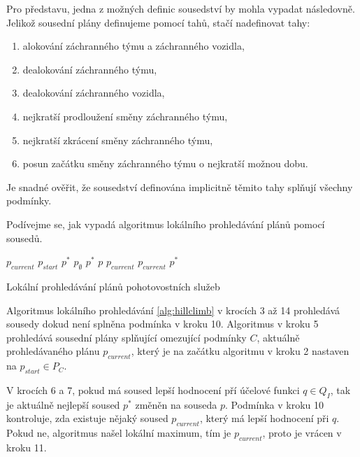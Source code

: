 \begin{exmp}\label{pr:sousedi}
Pro představu, jedna z možných definic sousedství by mohla vypadat následovně.
Jelikož sousední plány definujeme pomocí tahů, stačí nadefinovat tahy:
  \begin{enumerate}
    \item alokování záchranného týmu a záchranného vozidla,
    \item dealokování záchranného týmu,
    \item dealokování záchranného vozidla,
    \item nejkratší prodloužení směny záchranného týmu,
    \item nejkratší zkrácení směny záchranného týmu,
    \item posun začátku směny záchranného týmu o nejkratší možnou dobu.
  \end{enumerate}
\end{exmp}

Je snadné ověřit, že sousedství definována implicitně těmito tahy splňují všechny podmínky.

Podívejme se, jak vypadá algoritmus lokálního prohledávání plánů pomocí sousedů.

\begin{algorithm}[H]
  \begin{algorithmic}[1]
    \State $p_{current}$ \gets $p_{start}$
      \State $p^*$ \gets $p_{\emptyset}$ 
          \State $p^*$ \gets $p$
        \EndIf
      \EndFor
        \State \Return $p_{current}$
      \EndIf
      \State $p_{current}$ \gets $p^*$
    \EndWhile
  \EndFunction
  \end{algorithmic}
  \caption{Lokální prohledávání plánů pohotovostních služeb}
  \label{alg:hillclimb}
\end{algorithm}

Algoritmus lokálního prohledávání \ref{alg:hillclimb} v krocích 3 až 14 prohledává sousedy dokud není splněna podmínka v kroku 10.
Algoritmus v kroku 5 prohledává sousední plány splňující omezující podmínky $C$,
aktuálně prohledávaného plánu $p_{current}$, který je na začátku algoritmu v kroku 2 nastaven na $p_{start} \in P_C$.

V krocích 6 a 7, pokud má soused lepší hodnocení pří účelové funkci $q \in Q_I$, tak je aktuálně nejlepší soused $p^*$ změněn na souseda $p$.
Podmínka v kroku 10 kontroluje, zda existuje nějaký soused $p_{current}$, který má lepší hodnocení při $q$.
Pokud ne, algoritmus našel lokální maximum, tím je $p_{current}$, proto je vrácen v kroku 11.

